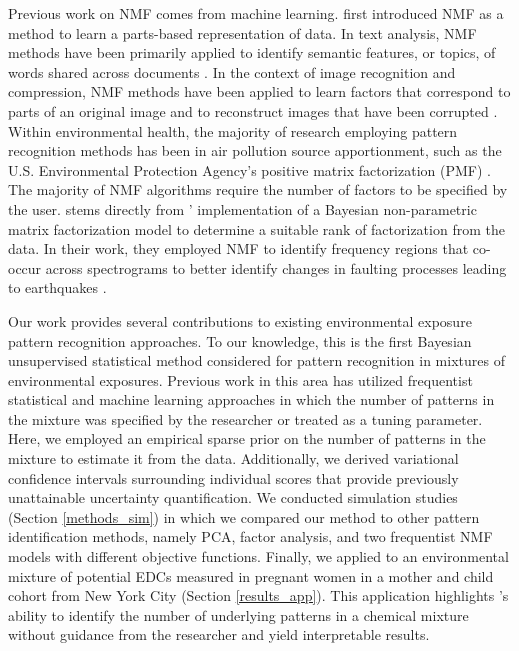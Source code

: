 Previous work on NMF comes from machine learning. \citet{lee1999learning} first introduced NMF as a method to learn a parts-based representation of data. In text analysis, NMF methods have been primarily applied to identify semantic features, or topics, of words shared across documents \cite{blei2003latent, paisley2014bayesian}. In the context of image recognition and compression, NMF methods have been applied to learn factors that correspond to parts of an original image and to reconstruct images that have been corrupted \cite{sandler2011nonnegative, cemgil2008bayesian}. Within environmental health, the majority of research employing pattern recognition methods has been in air pollution source apportionment, such as the U.S. Environmental Protection Agency's positive matrix factorization (PMF) \cite{paatero94}. The majority of NMF algorithms require the number of factors to be specified by the user. \bnmf stems directly from \citeauthor{holtzman2018machine}' implementation of a Bayesian non-parametric matrix factorization model to determine a suitable rank of factorization from the data. In their work, they employed NMF to identify frequency regions that co-occur across spectrograms to better identify changes in faulting processes leading to earthquakes \cite{holtzman2018machine}.

Our work provides several contributions to existing environmental exposure pattern recognition approaches. To our knowledge, this is the first Bayesian unsupervised statistical method considered for pattern recognition in mixtures of environmental exposures. Previous work in this area has utilized frequentist statistical and machine learning approaches in which the number of patterns in the mixture was specified by the researcher or treated as a tuning parameter. Here, we employed an empirical sparse prior on the number of patterns in the mixture to estimate it from the data. Additionally, we derived variational confidence intervals surrounding individual scores that provide previously unattainable uncertainty quantification. We conducted simulation studies (Section \ref{methods_sim}) in which we compared our method to other pattern identification methods, namely PCA, factor analysis, and two frequentist NMF models with different objective functions. Finally, we applied \bnmf to an environmental mixture of potential EDCs measured in pregnant women in a mother and child cohort from New York City (Section \ref{results_app}). This application highlights \bnmfc's ability to identify the number of underlying patterns in a chemical mixture without guidance from the researcher and yield interpretable results.

